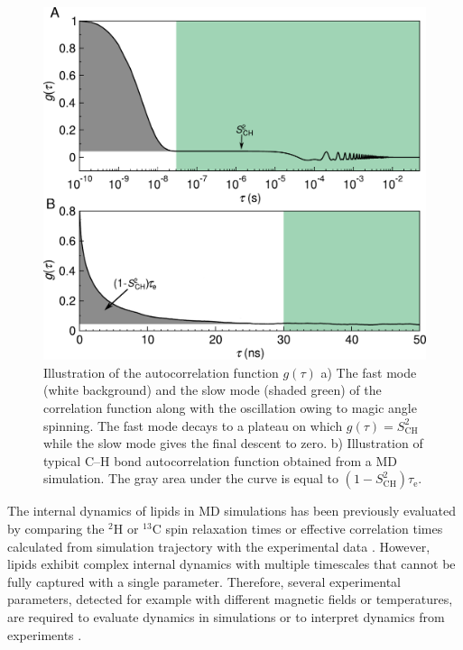 \documentclass[journal=jcisd8,manuscript=article,layout=twocolumn]{achemso}
\begin{document}
\begin{figure}[t]
\includegraphics[scale=0.45]{./figures/gfun_draft.pdf} 
\caption{Illustration of the autocorrelation function $g(\tau)$ a) The fast mode (white background) and the slow mode (shaded green) of the correlation function along with the oscillation owing to magic angle spinning. The fast mode decays to a plateau on which $g(\tau)=S^2_{\mathrm{CH}}$ while the slow mode gives the final descent to zero. b) Illustration of typical C--H bond autocorrelation function obtained from a MD simulation. The gray area under the curve is equal to $(1-S^2_{\mathrm{CH}})\tau_\mathrm{e}$. }
\label{fig:schem_teff}

\end{figure} 


The internal dynamics of lipids in MD simulations has been previously evaluated by comparing
the $^2$H or $^{13}$C spin relaxation times or effective correlation times calculated from simulation
trajectory with the experimental data \cite{feller02,wohlert06,klauda08,klauda08II,ferreira15,Ollila:2016a}.
However, lipids exhibit complex internal dynamics with multiple timescales that cannot be fully captured
with a single parameter. Therefore, several experimental parameters, detected for example with different
magnetic fields or temperatures, are required to evaluate dynamics in simulations or to interpret dynamics
from experiments \cite{Roberts:2009a,leftin11}.
\end{document}
